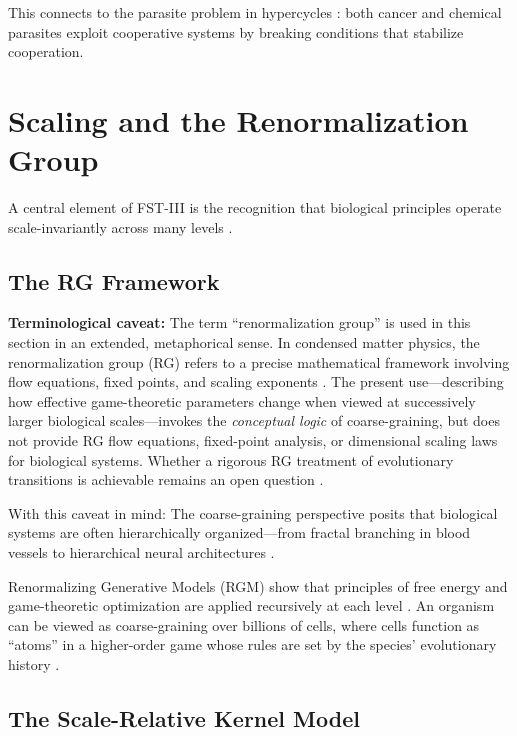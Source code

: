 \documentclass[12pt,a4paper]{article}
\theoremstyle{remark}
\begin{document}
This connects to the parasite problem in hypercycles \citep{FSTII}: both cancer and chemical parasites exploit cooperative systems by breaking conditions that stabilize cooperation.

\section{Scaling and the Renormalization Group}
\label{sec:renormalization}

A central element of FST-III is the recognition that biological principles operate scale-invariantly across many levels \citep{ScaleRGFrontiers,ScaleRGResearch}.

\subsection{The RG Framework}

\textbf{Terminological caveat:} The term ``renormalization group'' is used in this section in an extended, metaphorical sense. In condensed matter physics, the renormalization group (RG) refers to a precise mathematical framework involving flow equations, fixed points, and scaling exponents \citep{ScaleRGResearch}. The present use---describing how effective game-theoretic parameters change when viewed at successively larger biological scales---invokes the \emph{conceptual logic} of coarse-graining, but does not provide RG flow equations, fixed-point analysis, or dimensional scaling laws for biological systems. Whether a rigorous RG treatment of evolutionary transitions is achievable remains an open question \citep{ScaleRGFrontiers}.

With this caveat in mind: The coarse-graining perspective posits that biological systems are often hierarchically organized---from fractal branching in blood vessels to hierarchical neural architectures \citep{SelfSimilarNetworks}.

Renormalizing Generative Models (RGM) show that principles of free energy and game-theoretic optimization are applied recursively at each level \citep{ScaleRGFrontiers}. An organism can be viewed as coarse-graining over billions of cells, where cells function as ``atoms'' in a higher-order game whose rules are set by the species' evolutionary history \citep{ReplicatorOptimization}.

\subsection{The Scale-Relative Kernel Model}
\end{document}
